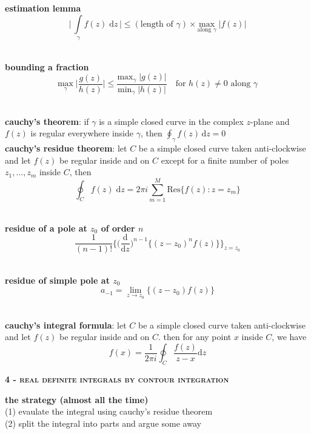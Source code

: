 \documentclass[a4paper]{article}
\newcommand\abs[1]{\ensuremath{\lvert#1\rvert}}
\begin{document}
\begin{multicols}{2}
\begin{framed}
	\noindent
	\textbf{estimation lemma}\\
	$$\Bigg\vert \, \int\limits_{\gamma} f(z) \; \mathrm{d}z \,\Bigg\vert \leq (\text{length of $\gamma$}) \times \underset{\text{along $\gamma$}}{\text{max}} \; \Big\vert f(z)\Big\vert$$\
	
	\noindent
	\textbf{bounding a fraction}\\
	$$\underset{\gamma}{\text{max}} \; \Bigg\vert \frac{g(z)}{h(z)} \Bigg\vert \leq \frac{\text{max}_\gamma \; \abs{g(z)}}{\text{min}_\gamma \; \abs{h(z)}} \quad \text{for $h(z) \neq 0$ along $\gamma$}$$\
	
	\noindent
	\textbf{cauchy's theorem}: if $\gamma$ is a simple closed curve in the complex $z$-plane and $f(z)$ is regular everywhere inside $\gamma$, then $\oint_\gamma f(z) \, \mathrm{d}z = 0$\\
	
	\noindent
	\textbf{cauchy's residue theorem}: let $C$ be a simple closed curve taken anti-clockwise and let $f(z)$ be regular inside and on $C$ except for a finite number of poles $z_1, \dots, z_m$ inside $C$, then
	$$\oint_C f(z) \; \mathrm{d}z = 2\pi i\sum\limits_{m=1}^M \mathrm{Res}\{f(z) : z = z_m\}$$\
	
	\noindent
	\textbf{residue of a pole at $z_0$ of order $n$}
	$$\frac{1}{(n - 1)!}\Bigg\{\Bigg(\frac{\textrm{d}}{\textrm{d}z}\Bigg)^{n-1}\Big\{(z-z_0)^n f(z)\Big\}\Bigg\}_{z = z_0}$$\
	
	\noindent
	\textbf{residue of simple pole at $z_0$}
	$$a_{-1} = \lim\limits_{z \rightarrow z_0} \Big\{(z - z_0) f(z)\Big\}$$\
	
	\noindent
	\textbf{cauchy's integral formula}: let $C$ be a simple closed curve taken anti-clockwise and let $f(z)$ be regular inside and on $C$. then for any point $x$ inside $C$, we have
	$$f(x) = \frac{1}{2\pi i}\oint_C \frac{f(z)}{z - x} \mathrm{d}z$$
\end{framed}

\begin{framed}
	\begin{center}
		\textbf{\textsc{4 - real definite integrals by contour integration}}
	\end{center}
	
	\noindent
	\textbf{the strategy (almost all the time)}\\
	(1) evaulate the integral using cauchy's residue theorem\\
	(2) split the integral into parts and argue some away\\
	

\end{framed}
\end{multicols}
\end{document}
